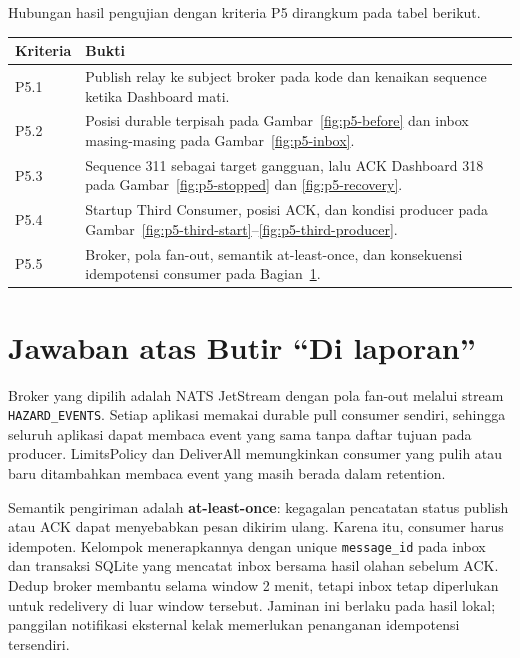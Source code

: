 Hubungan hasil pengujian dengan kriteria P5 dirangkum pada tabel berikut.
\begin{table}[H]
\centering\small
\begin{tabularx}{\textwidth}{>{\raggedright\arraybackslash}p{2cm}Y}
\toprule
Kriteria & Bukti \\
\midrule
P5.1 & Publish relay ke subject broker pada kode dan kenaikan sequence ketika Dashboard mati. \\
P5.2 & Posisi durable terpisah pada Gambar~\ref{fig:p5-before} dan inbox masing-masing pada Gambar~\ref{fig:p5-inbox}. \\
P5.3 & Sequence 311 sebagai target gangguan, lalu ACK Dashboard 318 pada Gambar~\ref{fig:p5-stopped} dan \ref{fig:p5-recovery}. \\
P5.4 & Startup Third Consumer, posisi ACK, dan kondisi producer pada Gambar~\ref{fig:p5-third-start}--\ref{fig:p5-third-producer}. \\
P5.5 & Broker, pola fan-out, semantik at-least-once, dan konsekuensi idempotensi consumer pada Bagian~\ref{sec:p5-di-laporan}. \\
\bottomrule
\end{tabularx}
\end{table}

\section{Jawaban atas Butir ``Di laporan''}
\label{sec:p5-di-laporan}
Broker yang dipilih adalah NATS JetStream dengan pola fan-out melalui stream \texttt{HAZARD\_EVENTS}. Setiap aplikasi memakai durable pull consumer sendiri, sehingga seluruh aplikasi dapat membaca event yang sama tanpa daftar tujuan pada producer. LimitsPolicy dan DeliverAll memungkinkan consumer yang pulih atau baru ditambahkan membaca event yang masih berada dalam retention.

Semantik pengiriman adalah \textbf{at-least-once}: kegagalan pencatatan status publish atau ACK dapat menyebabkan pesan dikirim ulang. Karena itu, consumer harus idempoten. Kelompok menerapkannya dengan unique \texttt{message\_id} pada inbox dan transaksi SQLite yang mencatat inbox bersama hasil olahan sebelum ACK. Dedup broker membantu selama window 2 menit, tetapi inbox tetap diperlukan untuk redelivery di luar window tersebut. Jaminan ini berlaku pada hasil lokal; panggilan notifikasi eksternal kelak memerlukan penanganan idempotensi tersendiri.
